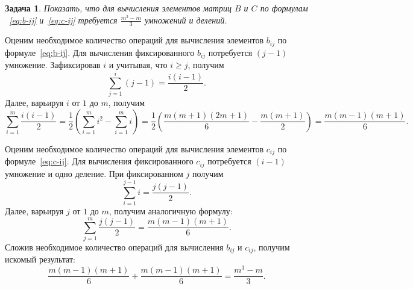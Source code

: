 \documentclass[11pt,a4paper,twoside,listtotoc,bibtotoc]{report}
\numberwithin{equation}{section}
\newtheorem*{problem}{Задача}
\theoremstyle{definition}
\theoremstyle{plain}
\begin{document}
%
%
\begin{problem}
    Показать, что для вычисления элементов матриц $B$ и $C$ по формулам
   ~\eqref{eq:b-ij} и~\eqref{eq:c-ij} требуется $\frac{m^3-m}{3}$
    умножений и делений.
\end{problem}
%
%
\begin{solution}
    Оценим необходимое количество операций для вычисления элементов $b_{ij}$
    по формуле~\eqref{eq:b-ij}. Для вычисления фиксированного $b_{ij}$
    потребуется $(j-1)$ умножение.
    Зафиксировав $i$ и учитывая, что $i \geqslant j$, получим
    $$
        \sum_{j=1}^i(j-1) = \frac{i(i-1)}{2}.
    $$
    Далее, варьируя $i$ от $1$ до $m$, получим
    $$
        \sum_{i=1}^m \frac{i(i-1)}{2} = \frac{1}{2}\left(\sum_{i=1}^m i^2 -
            \sum_{i=1}^m i \right) = \frac{1}{2}\left(\frac{m(m+1)(2m+1)}{6} -
                \frac{m(m+1)}{2}\right) = \frac{m(m-1)(m+1)}{6}.
    $$

    Оценим необходимое количество операций для вычисления элементов $c_{ij}$
    по формуле~\eqref{eq:c-ij}. Для вычисления фиксированного $c_{ij}$
    потребуется $(i-1)$ умножение и одно деление.
    При фиксированном $j$ получим
    $$
        \sum_{i=1}^{j-1}i = \frac{j(j-1)}{2}.
    $$
    Далее, варьируя $j$ от $1$ до $m$, получим аналогичную формулу:
    $$
        \sum_{j=1}^m \frac{j(j-1)}{2} = \frac{m(m-1)(m+1)}{6}.
    $$
    Сложив необходимое количество операций для вычисления $b_{ij}$ и $c_{ij}$,
    получим искомый результат:
    $$
        \frac{m(m-1)(m+1)}{6} + \frac{m(m-1)(m+1)}{6} = \frac{m^3-m}{3}.
    $$
\end{solution}
%
%
\end{document}
